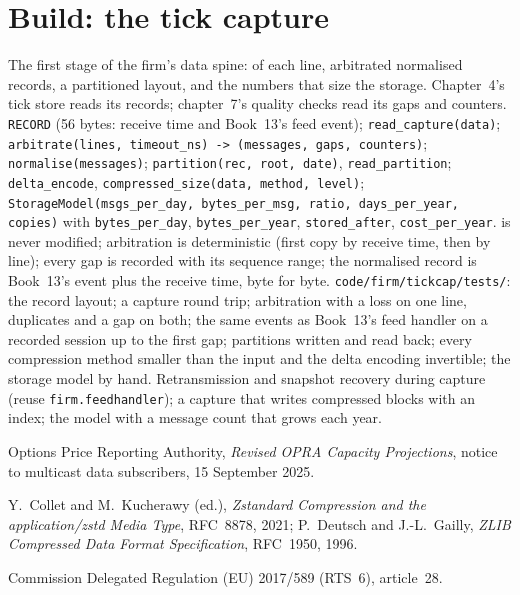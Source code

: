 \section{Build: the tick capture}\label{bld:pl:capturing-and-storing-tick-data:tickcap}

\begin{build}
 The first stage of the firm's data spine:  of each line, arbitrated normalised records, a
partitioned layout, and the numbers that size the storage. Chapter~4's tick store reads its records; chapter~7's quality checks
read its gaps and counters.
 \texttt{RECORD} (56 bytes: receive time and Book~13's feed event); \texttt{read\_capture(data)};
\texttt{arbitrate(lines, timeout\_ns) -> (messages, gaps, counters)}; \texttt{normalise(messages)};
\texttt{partition(rec, root, date)}, \texttt{read\_partition}; \texttt{delta\_encode}, \texttt{compressed\_size(data, method,
level)}; \texttt{StorageModel(msgs\_per\_day, bytes\_per\_msg, ratio, days\_per\_year, copies)} with \texttt{bytes\_per\_day},
\texttt{bytes\_per\_year}, \texttt{stored\_after}, \texttt{cost\_per\_year}.
  is never modified; arbitration is deterministic (first copy by receive time, then by line); every gap
is recorded with its sequence range; the normalised record is Book~13's event plus the receive time, byte for byte.
 \texttt{code/firm/tickcap/tests/}: the record layout; a capture round trip; arbitration with a loss on
one line, duplicates and a gap on both; the same events as Book~13's feed handler on a recorded session up to the first gap;
partitions written and read back; every compression method smaller than the input and the delta encoding invertible; the
storage model by hand.
 Retransmission and snapshot recovery during capture (reuse \texttt{firm.feedhandler}); a capture that writes
compressed blocks with an index; the model with a message count that grows each year.
\end{build}

\begin{omsources}
\item Options Price Reporting Authority, \emph{Revised OPRA Capacity Projections}, notice to multicast data subscribers,
15 September 2025.
\item Y.~Collet and M.~Kucherawy (ed.), \emph{Zstandard Compression and the application/zstd Media Type}, RFC~8878, 2021;
P.~Deutsch and J.-L.~Gailly, \emph{ZLIB Compressed Data Format Specification}, RFC~1950, 1996.
\item Commission Delegated Regulation (EU) 2017/589 (RTS~6), article~28.
\end{omsources}

